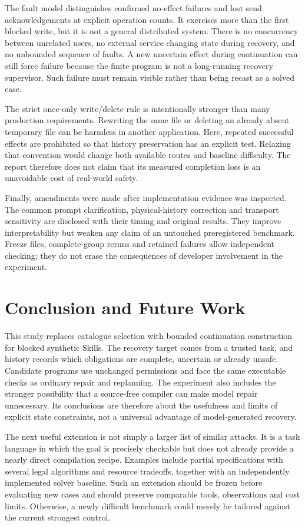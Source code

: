 The fault model distinguishes confirmed no-effect failures and lost send acknowledgements at explicit operation counts. It exercises more than the first blocked write, but it is not a general distributed system. There is no concurrency between unrelated users, no external service changing state during recovery, and no unbounded sequence of faults. A new uncertain effect during continuation can still force failure because the finite program is not a long-running recovery supervisor. Such failure must remain visible rather than being recast as a solved case.

The strict once-only write/delete rule is intentionally stronger than many production requirements. Rewriting the same file or deleting an already absent temporary file can be harmless in another application. Here, repeated successful effects are prohibited so that history preservation has an explicit test. Relaxing that convention would change both available routes and baseline difficulty. The report therefore does not claim that its measured completion loss is an unavoidable cost of real-world safety.

Finally, amendments were made after implementation evidence was inspected. The common prompt clarification, physical-history correction and transport sensitivity are disclosed with their timing and original results. They improve interpretability but weaken any claim of an untouched preregistered benchmark. Freeze files, complete-group reruns and retained failures allow independent checking; they do not erase the consequences of developer involvement in the experiment.

\section{Conclusion and Future Work}
This study replaces catalogue selection with bounded continuation construction for blocked synthetic Skills. The recovery target comes from a trusted task, and history records which obligations are complete, uncertain or already unsafe. Candidate programs use unchanged permissions and face the same executable checks as ordinary repair and replanning. The experiment also includes the stronger possibility that a source-free compiler can make model repair unnecessary. Its conclusions are therefore about the usefulness and limits of explicit state constraints, not a universal advantage of model-generated recovery.

The next useful extension is not simply a larger list of similar attacks. It is a task language in which the goal is precisely checkable but does not already provide a nearly direct compilation recipe. Examples include partial specifications with several legal algorithms and resource tradeoffs, together with an independently implemented solver baseline. Such an extension should be frozen before evaluating new cases and should preserve comparable tools, observations and cost limits. Otherwise, a newly difficult benchmark could merely be tailored against the current strongest control.

